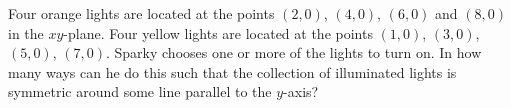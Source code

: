Four orange lights are located at the points $(2,0)$, $(4,0)$, $(6,0)$ and $(8,0)$ in the $xy$-plane.  Four yellow lights are located at the points $(1,0)$, $(3,0)$, $(5,0)$, $(7,0)$.  Sparky chooses one or more of the lights to turn on.  In how many ways can he do this such that the collection of illuminated lights is symmetric around some line parallel to the $y$-axis?
